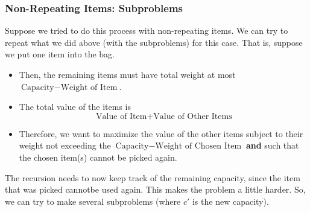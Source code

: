 \documentclass[letterpaper]{article}
\begin{document}
\subsubsection{Non-Repeating Items: Subproblems}
Suppose we tried to do this process with non-repeating items. We can try to repeat what we did above (with the subproblems) for this case. That is, suppose we put one item into the bag. 
\begin{itemize}
    \item Then, the remaining items must have total weight at most $\text{Capacity} - \text{Weight of Item}$.
    \item The total value of the items is 
    \[\text{Value of Item} + \text{Value of Other Items}\]
    \item Therefore, we want to maximize the value of the other items subject to their weight not exceeding the $\text{Capacity} - \text{Weight of Chosen Item}$ \textbf{and} such that the chosen item(s) cannot be picked again. 
\end{itemize}
The recursion needs to now keep track of the remaining capacity, since the item that was picked cannotbe used again. This makes the problem a little harder. So, we can try to make several subproblems (where $c'$ is the new capacity).
\end{document}
